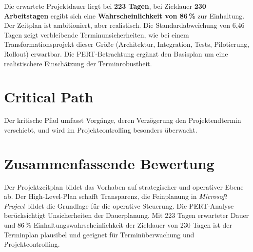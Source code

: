 Die erwartete Projektdauer liegt bei \textbf{223 Tagen}, bei Zieldauer
\textbf{230 Arbeitstagen} ergibt sich eine \textbf{Wahrscheinlichkeit von
86\,\%} zur Einhaltung. Der Zeitplan ist ambitioniert, aber realistisch. Die
Standardabweichung von 6{,}46 Tagen zeigt verbleibende Terminunsicherheiten,
wie bei einem Transformationsprojekt dieser Größe (Architektur, Integration,
Tests, Pilotierung, Rollout) erwartbar. Die \ac{PERT}-Betrachtung ergänzt den
Basisplan um eine realistischere Einschätzung der Terminrobustheit.

\section{Critical Path}

Der kritische Pfad umfasst Vorgänge, deren Verzögerung den Projektendtermin
verschiebt, und wird im Projektcontrolling besonders überwacht.

\clearpage

\clearpage

\section{Zusammenfassende Bewertung}

Der Projektzeitplan bildet das Vorhaben auf strategischer und operativer Ebene
ab. Der High-Level-Plan schafft Transparenz, die Feinplanung in
\textit{Microsoft Project} bildet die Grundlage für die operative Steuerung.
Die \ac{PERT}-Analyse berücksichtigt Unsicherheiten der Dauerplanung. Mit
223 Tagen erwarteter Dauer und 86\,\% Einhaltungswahrscheinlichkeit der
Zieldauer von 230 Tagen ist der Terminplan plausibel und geeignet für
Terminüberwachung und Projektcontrolling.